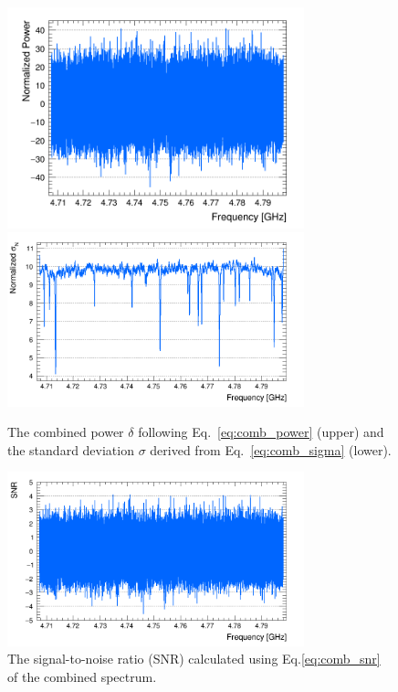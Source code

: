 \begin{figure}[h]
    \centering
    \includegraphics[width=8.6cm]{figures/Power_CombSpectrum_AxionRun_AllSteps_Rescan_SG4_W201_LqWeight.png}
    \includegraphics[width=8.6cm]{figures/Sigma_CombSpectrum_AxionRun_AllSteps_Rescan_SG4_W201_LqWeight.png}
    \caption{The combined power $\delta$ following Eq.~\eqref{eq:comb_power} 
(upper) and the standard deviation $\sigma$ derived from 
Eq.~\eqref{eq:comb_sigma} (lower).}
    \label{fig:power_sigma_comb}
\end{figure}

\begin{figure}[hbt!]
    \centering
    \includegraphics[width=8.6cm]{figures/SNR_CombSpectrum_AxionRun_AllSteps_Rescan_SG4_W201_LqWeight.png}
    \caption{The signal-to-noise ratio (SNR) calculated using 
Eq.\eqref{eq:comb_snr} of the combined spectrum. }
    \label{fig:SNR_comb}
\end{figure}


